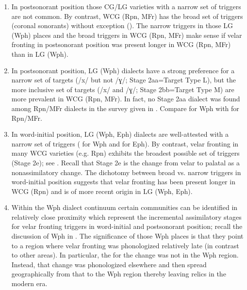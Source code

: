 \begin{enumerate}[label=(\Alph*)]
\item In postsonorant position those CG/LG varieties with a narrow set of triggers are not common. By contrast, WCG (Rpn, MFr) has the broad set of triggers (coronal sonorants) without exception (). The narrow triggers in those LG (Wph) places and the broad triggers in WCG (Rpn, MFr) make sense if velar fronting in postsonorant position was present longer in WCG (Rpn, MFr) than in LG (Wph).
\item In postsonorant position, LG (Wph) dialects have a strong preference for a narrow set of targets (/x/ but not /ɣ/; Stage 2aa=Target Type L), but the more inclusive set of targets (/x/ and /ɣ/; Stage 2bb=Target Type M) are more prevalent in WCG (Rpn, MFr). In fact, no Stage 2aa dialect was found among Rpn/MFr dialects in the survey given in . Compare  for Wph with  for Rpn/MFr.
\item In word-initial position, LG (Wph, Eph) dialects are well-attested with a narrow set of triggers ( for Wph and  for Eph). By contrast, velar fronting in many WCG varieties (e.g. Rpn) exhibits the broadest possible set of triggers (Stage 2e); see . Recall that Stage 2e is the change from velar to palatal as a nonassimilatory change. The dichotomy between broad vs. narrow triggers in word-initial position suggests that velar fronting has been present longer in WCG (Rpn) and is of more recent origin in LG (Wph, Eph).
\item Within the Wph dialect continuum certain communities can be identified in relatively close proximity which represent the incremental assimilatory stages for velar fronting triggers in word-initial and postsonorant position; recall the discussion of Wph in . The significance of those Wph places is that they point to a region where velar fronting was phonologized relatively late (in contrast to other areas). In particular, the  for the change was not in the Wph region. Instead, that change was phonologized elsewhere and then spread geographically from that  to the Wph region thereby leaving relics in the modern era.
\end{enumerate}

